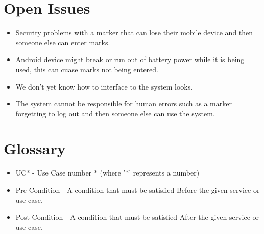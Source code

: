 \documentclass[a4paper]{article}
\begin{document}
	\section{Open Issues}
	
		\begin{itemize}
			\item Security problems with a marker that can lose their mobile device and then someone else can enter marks.
			\item Android device might break or run out of battery power while it is being used, this can cuase marks not being entered.
			\item We don't yet know how to interface to the system looks.
			\item The system cannot be responsible for human errors such as a marker forgetting to log out and then someone else can use the system.
		\end{itemize}
	

	\section{Glossary}
		
		\begin{itemize}
			\item UC* - Use Case number * (where '*' represents a number)
			\item Pre-Condition - A condition that must be satisfied Before the given service or use case.
			\item Post-Condition - A condition that must be satisfied After the given service or use case.
		\end{itemize}
\end{document}
